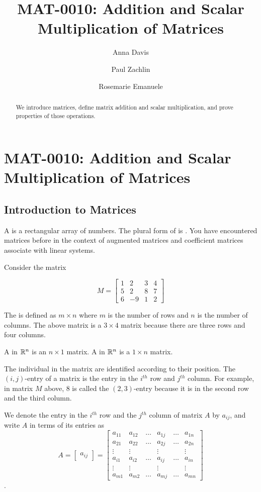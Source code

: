\documentclass{ximera}
\author{Anna Davis \and Paul Zachlin \and Rosemarie Emanuele} \title{MAT-0010:  Addition and Scalar Multiplication of Matrices} \license{CC-BY 4.0}
\begin{document}
\begin{abstract}
  We introduce matrices, define matrix addition and scalar multiplication, and prove properties of those operations.
\end{abstract}
\maketitle

\section*{MAT-0010:  Addition and Scalar Multiplication of Matrices}

\subsection*{Introduction to Matrices}

A  is a rectangular array of numbers. The plural form of  is . You have encountered matrices before in the context of augmented matrices and coefficient matrices associate with linear systems.

Consider the matrix

$$M=\begin{bmatrix}
1 & 2 & 3 & 4 \\
5 & 2 & 8 & 7 \\
6 & -9 & 1 & 2
\end{bmatrix}$$

The  is defined as $m\times n$ where $m$ is the
number of rows and $n$ is the number of columns. The above matrix is a 
$3\times 4$ matrix because there are three rows and four columns.  

A  in $\mathbb{R}^n$ is an $n\times 1$ matrix.  A  in $\mathbb{R}^n$ is a $1\times n$ matrix.  

The individual  in the matrix are identified according to their position. The $( i, j)$-entry of a matrix is the entry 
in the $i^{th}$ row and $j^{th}$ column. For example, in matrix $M$ above,  $8$ is called the $(2,3)$-entry because it is in the second row and the third column. 

We denote the entry in the $i^{th}$ row  and the $j^{th}$ column of matrix $A$ by $a_{ij}$, and write $A$ in terms of its entries
as $$A= \begin{bmatrix} a_{ij} \end{bmatrix}=\begin{bmatrix}
           a_{11} & a_{12}&\dots&a_{1j}&\dots&a_{1n}\\
           a_{21}&a_{22} &\dots&a_{2j}&\dots &a_{2n}\\
		\vdots & \vdots&&\vdots&&\vdots\\
        a_{i1}&a_{i2}&\dots &a_{ij}&\dots &a_{in}\\
        \vdots & \vdots&&\vdots&&\vdots\\
		a_{m1}&a_{m2}&\dots &a_{mj}&\dots &a_{mn}
         \end{bmatrix}$$. 
\end{document}
